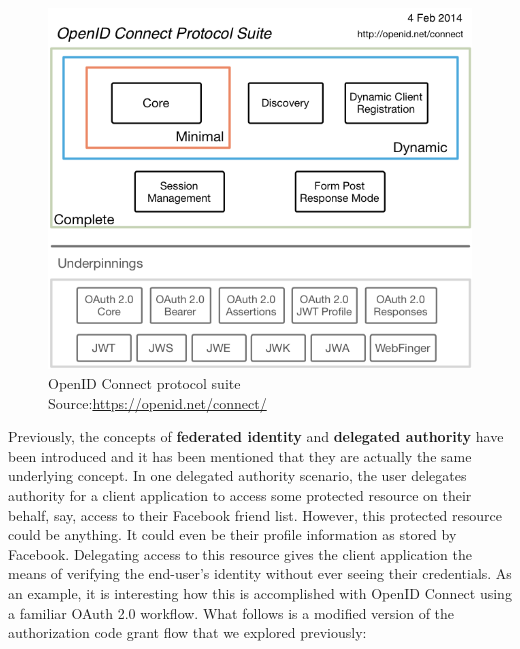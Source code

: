 \begin{figure}
    \centering
    \includegraphics[scale=2.0]{chapters/images/chp3/OpenIDC-map.png}
    \caption[caption]{OpenID Connect protocol suite\\\hspace{\textwidth}Source:\hspace{0.2cm}\url{https://openid.net/connect/}}
    \label{fig:oidc}
\end{figure}

Previously, the concepts of \textbf{federated identity} and \textbf{delegated authority} have been introduced and it has been mentioned that they are actually the same underlying concept. In one delegated authority scenario, the user delegates authority for a client application to access some protected resource on their behalf, say, access to their Facebook friend list. However, this protected resource could be anything. It could even be their profile information as stored by Facebook. Delegating access to this resource gives the client application the means of verifying the end-user's identity without ever seeing their credentials. As an example, it is interesting how this is accomplished with OpenID Connect using a familiar OAuth 2.0 workflow. What follows is a modified version of the authorization code grant flow that we explored previously:

